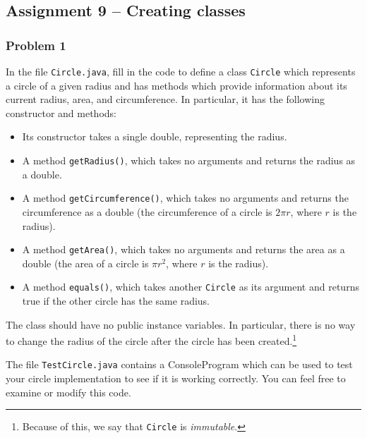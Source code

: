 \documentclass[11pt]{article}
\theoremstyle{plain}
\theoremstyle{definition}
\theoremstyle{remark}
\begin{document}
\begin{center}
\section*{Assignment 9 -- Creating classes}
\end{center}
\subsubsection*{Problem 1}
In the file {\tt Circle.java}, fill in the code to define a class {\tt Circle}
which represents a circle of a given radius and has methods which provide
information about its current radius, area, and circumference. In particular, it
has the following constructor and methods:
\begin{itemize}
  \item Its constructor takes a single double, representing the radius.
  \item A method {\tt getRadius()}, which takes no arguments and returns the
    radius as a double.
  \item A method {\tt getCircumference()}, which takes no arguments and returns
    the circumference as a double (the circumference of a circle is $2\pi r$,
    where $r$ is the radius).
  \item A method {\tt getArea()}, which takes no arguments and returns the area
    as a double (the area of a circle is $\pi r^2$, where $r$ is the radius).
  \item A method {\tt equals()}, which takes another {\tt Circle} as its
    argument and returns true if the other circle has the same radius.
\end{itemize}
The class should have no public instance variables. In particular, there is no
way to change the radius of the circle after the circle has been
created.\footnote{Because of this, we say that {\tt Circle} is
\emph{immutable}.}

The file {\tt TestCircle.java} contains a ConsoleProgram which can be used to
test your circle implementation to see if it is working correctly. You can feel
free to examine or modify this code.
\end{document}
